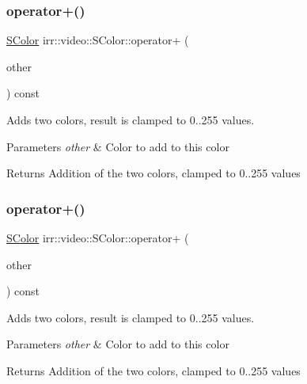 \subsubsection{\texorpdfstring{operator+()}{operator+()}\hspace{0.1cm}{\footnotesize\ttfamily [1/2]}}
{\footnotesize\ttfamily \hyperlink{classirr_1_1video_1_1SColor}{S\+Color} irr\+::video\+::\+S\+Color\+::operator+ (\begin{DoxyParamCaption}\item[{const \hyperlink{classirr_1_1video_1_1SColor}{S\+Color} \&}]{other }\end{DoxyParamCaption}) const\hspace{0.3cm}{\ttfamily [inline]}}



Adds two colors, result is clamped to 0..255 values. 


\begin{DoxyParams}{Parameters}
{\em other} & Color to add to this color \\
\hline
\end{DoxyParams}
\begin{DoxyReturn}{Returns}
Addition of the two colors, clamped to 0..255 values 
\end{DoxyReturn}
\mbox{\label{classirr_1_1video_1_1SColor_a3de50f1cde7bf3f5b1af79c64cd0cdbd}} 
\subsubsection{\texorpdfstring{operator+()}{operator+()}\hspace{0.1cm}{\footnotesize\ttfamily [2/2]}}
{\footnotesize\ttfamily \hyperlink{classirr_1_1video_1_1SColor}{S\+Color} irr\+::video\+::\+S\+Color\+::operator+ (\begin{DoxyParamCaption}\item[{const \hyperlink{classirr_1_1video_1_1SColor}{S\+Color} \&}]{other }\end{DoxyParamCaption}) const\hspace{0.3cm}{\ttfamily [inline]}}



Adds two colors, result is clamped to 0..255 values. 


\begin{DoxyParams}{Parameters}
{\em other} & Color to add to this color \\
\hline
\end{DoxyParams}
\begin{DoxyReturn}{Returns}
Addition of the two colors, clamped to 0..255 values 
\end{DoxyReturn}
\mbox{\label{classirr_1_1video_1_1SColor_adf45f90ff13a1eb56b5784a3fba20247}} 
